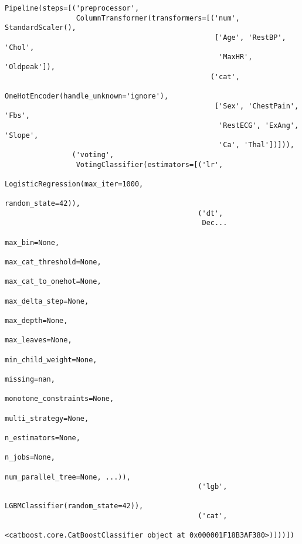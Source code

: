 \documentclass[
  letterpaper,
  DIV=11,
  numbers=noendperiod]{scrreprt}
\begin{document}
\begin{verbatim}
Pipeline(steps=[('preprocessor',
                 ColumnTransformer(transformers=[('num', StandardScaler(),
                                                  ['Age', 'RestBP', 'Chol',
                                                   'MaxHR', 'Oldpeak']),
                                                 ('cat',
                                                  OneHotEncoder(handle_unknown='ignore'),
                                                  ['Sex', 'ChestPain', 'Fbs',
                                                   'RestECG', 'ExAng', 'Slope',
                                                   'Ca', 'Thal'])])),
                ('voting',
                 VotingClassifier(estimators=[('lr',
                                               LogisticRegression(max_iter=1000,
                                                                  random_state=42)),
                                              ('dt',
                                               Dec...
                                                             max_bin=None,
                                                             max_cat_threshold=None,
                                                             max_cat_to_onehot=None,
                                                             max_delta_step=None,
                                                             max_depth=None,
                                                             max_leaves=None,
                                                             min_child_weight=None,
                                                             missing=nan,
                                                             monotone_constraints=None,
                                                             multi_strategy=None,
                                                             n_estimators=None,
                                                             n_jobs=None,
                                                             num_parallel_tree=None, ...)),
                                              ('lgb',
                                               LGBMClassifier(random_state=42)),
                                              ('cat',
                                               <catboost.core.CatBoostClassifier object at 0x000001F18B3AF380>)]))])
\end{verbatim}
\end{document}

